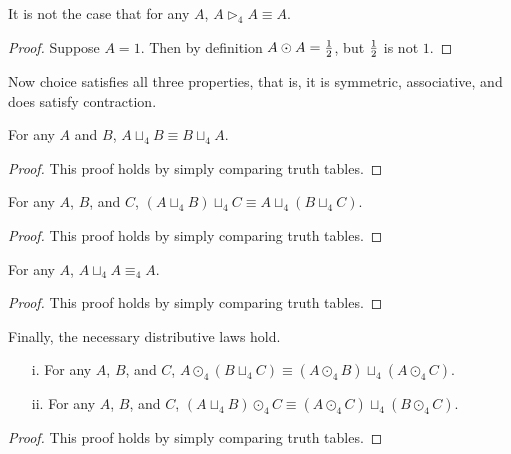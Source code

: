 \begin{lemma}
  \label{lemma:sequential_conjunction_is_not_contractive}
  It is not the case that for any $A$, $A \rhd_4 A \equiv A$.
\end{lemma}
\begin{proof}
  Suppose $A = 1$.  Then by definition $A \odot A = \frac{1}{2}$, but
  $\frac{1}{2}$ is not $1$.
\end{proof}
Now choice satisfies all three properties, that is, it is symmetric,
associative, and does satisfy contraction.
\begin{lemma}
  \label{lemma:choice_is_symmetric}
  For any $A$ and $B$, $A \sqcup_4 B \equiv B \sqcup_4 A$.
\end{lemma}
\begin{proof}
  This proof holds by simply comparing truth tables.
\end{proof}

\begin{lemma}
  \label{lemma:choice_is_associative}
  For any $A$, $B$, and $C$, $(A \sqcup_4 B) \sqcup_4 C \equiv A \sqcup_4 (B \sqcup_4 C)$.
\end{lemma}
\begin{proof}
  This proof holds by simply comparing truth tables.
\end{proof}

\begin{lemma}
  \label{lemma:choice_is_contractive}
  For any $A$, $A \sqcup_4 A \equiv_4 A$.
\end{lemma}
\begin{proof}
  This proof holds by simply comparing truth tables.
\end{proof}
Finally, the necessary distributive laws hold.
\begin{lemma}
  \label{lemma:parallel_conjunction_distributes_over_choice}
  \begin{itemize}
  \item[i.] For any $A$, $B$, and $C$, $A \odot_4 (B \sqcup_4 C) \equiv (A \odot_4 B) \sqcup_4 (A \odot_4 C)$.
  \item[ii.] For any $A$, $B$, and $C$, $(A \sqcup_4 B) \odot_4 C \equiv (A \odot_4 C) \sqcup_4 (B \odot_4 C)$.
  \end{itemize}
\end{lemma}
\begin{proof}
  This proof holds by simply comparing truth tables.
\end{proof}

